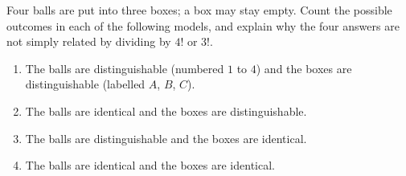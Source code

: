 Four balls are put into three boxes; a box may stay empty. Count the possible outcomes in each of the following models, and explain why the four answers are not simply related by dividing by $4!$ or $3!$.
\begin{enumerate}
\item[(a)] The balls are distinguishable (numbered $1$ to $4$) and the boxes are distinguishable (labelled $A$, $B$, $C$).
\item[(b)] The balls are identical and the boxes are distinguishable.
\item[(c)] The balls are distinguishable and the boxes are identical.
\item[(d)] The balls are identical and the boxes are identical.
\end{enumerate}
